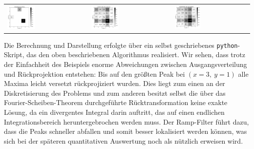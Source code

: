         \begin{tabular}{p{5.3cm}p{5.3cm}p{5.3cm}}
                	\includegraphics[width=0.36\textwidth, height=0.2\textheight]{pic/radonInp.png}
                    & 
                    \includegraphics[width=0.36\textwidth, height=0.2\textheight]{pic/radonGef.png}
                    &
                  	\includegraphics[width=0.355\textwidth, height=0.19\textheight]{pic/radonUngef.png}                                     
         \end{tabular}
         \label{dfd:Radon}
         \vspace{3mm}  
        
        Die Berechnung und Darstellung erfolgte über ein selbst geschriebenes \texttt{python}-Skript, das den oben beschriebenen Algorithmus realisiert. Wir sehen, dass trotz der Einfachheit des Beispiels enorme Abweichungen zwischen Ausgangsverteilung und Rückprojektion entstehen: Bis auf den größten Peak bei $(x = 3,\ y = 1)$ alle Maxima leicht versetzt rückprojiziert wurden. Dies liegt zum einen an der Diskretisierung des Problems und zum anderen besitzt selbst die über das Fourier-Scheiben-Theorem durchgeführte Rücktransformation keine exakte Lösung, da ein divergentes Integral darin auftritt, das auf einen endlichen Integrationsbereich heruntergebrochen werden muss.\cite{PA} Der Ramp-Filter führt dazu, dass die Peaks schneller abfallen und somit besser lokalisiert werden können, was sich bei der späteren quantitativen Auswertung noch als nützlich erweisen wird.

